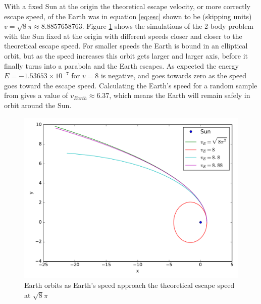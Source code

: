 \documentclass{article}
\begin{document}
With a fixed Sun at the origin the theoretical escape velocity, or more correctly escape speed, of the Earth was in equation \ref{eq:esc} shown to be (skipping units) $v=\sqrt{8}\pi\approx8.8857658763$. Figure \ref{fig:esc} shows the simulations of the 2-body problem with the Sun fixed at the origin with different speeds closer and closer to the theoretical escape speed. For smaller speeds the Earth is bound in an elliptical orbit, but as the speed increases this orbit gets larger and larger axis, before it finally turns into a parabola and the Earth escapes. As expected the energy $E=-1.53653\times 10^{-7}$ for $v=8$ is negative, and goes towards zero as the speed goes toward the escape speed. Calculating the Earth's speed for a random sample from \cite{eph} gives a value of $v_{Earth}\approx6.37$, which means the Earth will remain safely in orbit around the Sun.

\begin{figure}
\centering
\includegraphics[width=0.8\linewidth]{fig/Two_Bodies_Escape_2D.pdf}
\caption{Earth orbits as Earth's speed approach the theoretical escape speed at $\sqrt{8}\pi$}
\label{fig:esc}
\end{figure}

\FloatBarrier
\end{document}
